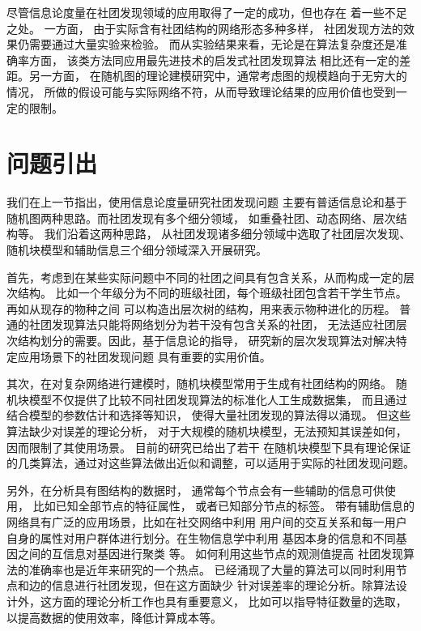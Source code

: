 尽管信息论度量在社团发现领域的应用取得了一定的成功，但也存在
着一些不足之处。
一方面，
由于实际含有社团结构的网络形态多种多样，
社团发现方法的效果仍需要通过大量实验来检验。
而从实验结果来看，无论是在算法复杂度还是准确率方面，
该类方法同应用最先进技术的启发式社团发现算法
相比还有一定的差距。另一方面，
在随机图的理论建模研究中，通常考虑图的规模趋向于无穷大的情况，
所做的假设可能与实际网络不符，从而导致理论结果的应用价值也受到一定的限制。

\section{问题引出}
我们在上一节指出，使用信息论度量研究社团发现问题
主要有普适信息论和基于随机图两种思路。而社团发现有多个细分领域，
如重叠社团、动态网络、层次结构等。
我们沿着这两种思路，
从社团发现诸多细分领域中选取了社团层次发现、随机块模型和辅助信息三个细分领域深入开展研究。




首先，考虑到在某些实际问题中不同的社团之间具有包含关系，从而构成一定的层次结构。
比如一个年级分为不同的班级社团，每个班级社团包含若干学生节点。
再如从现存的物种之间
可以构造出层次树的结构，用来表示物种进化的历程。
普通的社团发现算法只能将网络划分为若干没有包含关系的社团，
无法适应社团层次结构划分的需要。因此，基于信息论的指导，
研究新的层次发现算法对解决特定应用场景下的社团发现问题
具有重要的实用价值。

其次，在对复杂网络进行建模时，随机块模型常用于生成有社团结构的网络。
随机块模型不仅提供了比较不同社团发现算法的标准化人工生成数据集，
而且通过结合模型的参数估计和选择等知识，
使得大量社团发现的算法得以涌现。
但这些算法缺少对误差的理论分析，
对于大规模的随机块模型，无法预知其误差如何，
因而限制了其使用场景。
目前的研究已给出了若干
在随机块模型下具有理论保证的几类算法，通过对这些算法做出近似和调整，可以适用于实际的社团发现问题。

另外，在分析具有图结构的数据时，
通常每个节点会有一些辅助的信息可供使用，
比如已知全部节点的特征属性，
或者已知部分节点的标签。
带有辅助信息的网络具有广泛的应用场景，比如在社交网络中利用
用户间的交互关系和每一用户自身的属性对用户群体进行划分。在生物信息学中利用
基因本身的信息和不同基因之间的互信息对基因进行聚类 \cite{4359897}等。
如何利用这些节点的观测值提高
社团发现算法的准确率也是近年来研究的一个热点。
已经涌现了大量的算法可以同时利用节点和边的信息进行社团发现，但在这方面缺少
针对误差率的理论分析。除算法设计外，这方面的理论分析工作也具有重要意义，
比如可以指导特征数量的选取，
以提高数据的使用效率，降低计算成本等。



